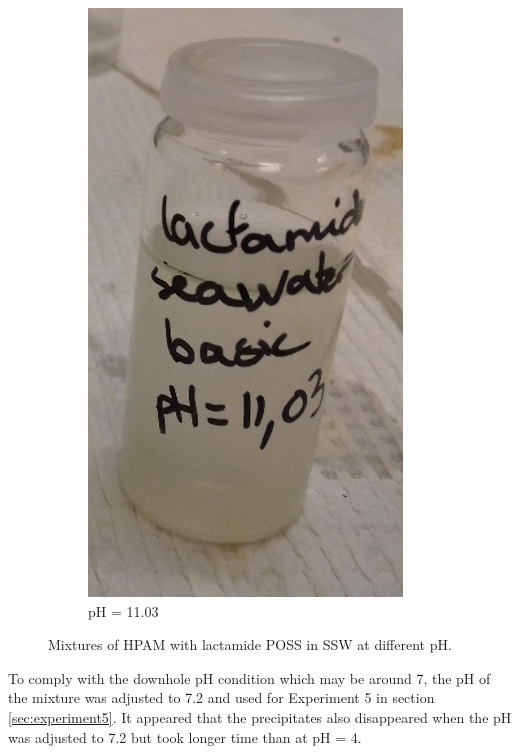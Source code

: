 \begin{figure}
\begin{subfigure}[b]{0.3\textwidth}
         \includegraphics[width=\textwidth]{img/fig/ph3.png}
         \caption{pH = 11.03}
     \end{subfigure}
        \caption{Mixtures of HPAM with lactamide POSS in SSW at different pH.}
        \label{fig:phLactamide}
\end{figure}

To comply with the downhole pH condition which may be around 7, the pH of the mixture was adjusted to 7.2 and used for Experiment 5 in section \ref{sec:experiment5}. It appeared that the precipitates also disappeared when the pH was adjusted to 7.2 but took longer time than at pH = 4. 

